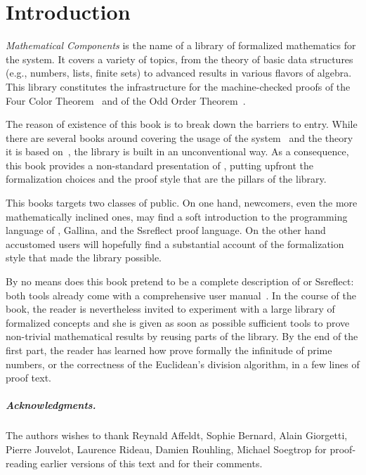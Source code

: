 \setcounter{chapter}{-1}
\chapter{Introduction}

\emph{Mathematical Components}
is the name of a library of formalized mathematics for the
\Coq{} system.  It covers a variety of
topics, from the theory of basic data structures (e.g., numbers, lists, finite
sets) to advanced results in various flavors of algebra. This library
constitutes the infrastructure for the machine-checked proofs of the
Four Color Theorem~\cite{Gonthier08} and of the
Odd Order Theorem~\cite{gonthier:hal-00816699}.

The reason of existence of this book is to break down the barriers to entry.
While there are several books around covering the usage of the
\Coq{} system~\cite{BC04,SF,CPDT}
and the theory it is based
on~\cite[chapter 4]{Coq:manual}\cite{paulinmohring:hal-01094195,hottbook},
the \mcbMC{} library is built
in an unconventional way.  As a consequence, this book provides a
non-standard presentation of \Coq{}, putting upfront the formalization
choices and the proof style that are the pillars of the library.

This books targets two classes of public.  On one hand, newcomers,
even the more mathematically inclined ones, may find a soft
introduction to the programming
language of \Coq{}, Gallina, and the Ssreflect proof language.
On the other hand accustomed \Coq{} users will hopefully find a
substantial account of the formalization style that made the \mcbMC{}
library possible.


By no means does this book pretend to be a complete description of \Coq{} or
Ssreflect: both tools already come with a comprehensive user
manual~\cite{Coq:manual,ssrman}.
In the course of the book, the reader is nevertheless invited to
experiment with  a large library of formalized concepts and she is
given as soon as possible sufficient tools to prove non-trivial
mathematical results by reusing parts of the library. By the end of
the first part, the reader has learned how prove formally the
infinitude of prime numbers, or the correctness of the Euclidean's
division algorithm, in a few lines of proof text.

\paragraph{Acknowledgments.} The authors wishes to thank
Reynald Affeldt, Sophie Bernard, Alain Giorgetti, Pierre Jouvelot,
Laurence Rideau, Damien Rouhling, Michael Soegtrop for proof-reading
earlier versions of this text and for their comments.

